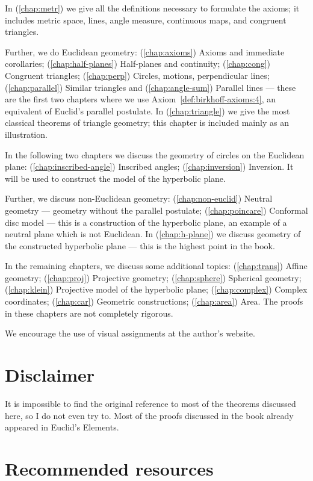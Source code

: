 In (\ref{chap:metr}) we give all the definitions necessary to formulate the axioms;
it includes metric space, 
lines, 
angle measure, 
continuous maps,
and congruent triangles.

Further, we do Euclidean geometry:
(\ref{chap:axioms}) Axioms and immediate corollaries;
(\ref{chap:half-planes}) Half-planes and continuity;
(\ref{chap:cong}) Congruent triangles;
(\ref{chap:perp}) Circles, motions, perpendicular lines;
(\ref{chap:parallel}) Similar triangles and (\ref{chap:angle-sum}) Parallel lines  
--- these are the first two chapters where we use Axiom~\ref{def:birkhoff-axioms:4}, an equivalent of Euclid's parallel postulate.
In (\ref{chap:triangle}) we give the most classical theorems of triangle geometry;
this chapter is included mainly as an illustration.

In the following two chapters we discuss the geometry of circles on the Euclidean plane:
(\ref{chap:inscribed-angle}) Inscribed angles; (\ref{chap:inversion}) Inversion.
It  will be used to construct the model of the hyperbolic plane.

Further, we discuss non-Euclidean geometry:
(\ref{chap:non-euclid})
Neutral geometry --- geometry without the parallel postulate;
(\ref{chap:poincare})
Conformal disc model ---
this is a construction of the hyperbolic plane,
an example of a neutral plane which is not Euclidean.
In (\ref{chap:h-plane}) we discuss geometry of the constructed hyperbolic plane --- this is the highest point in the book.

In the remaining chapters, we discuss some additional topics:
(\ref{chap:trans}) Affine geometry;
(\ref{chap:proj}) Projective geometry;
(\ref{chap:sphere}) Spherical geometry;
(\ref{chap:klein}) Projective model of the hyperbolic plane;
(\ref{chap:complex}) Complex coordinates;
(\ref{chap:car}) Geometric constructions;
(\ref{chap:area}) Area.
The proofs in these chapters are not completely rigorous.

We encourage the use of visual assignments at the author's website.

\section{Disclaimer}

It is  impossible to find the original reference to most of the theorems discussed here, so I do not even try to.
Most of the proofs discussed in the book 
already appeared in Euclid's Elements.

\section{Recommended resources}

